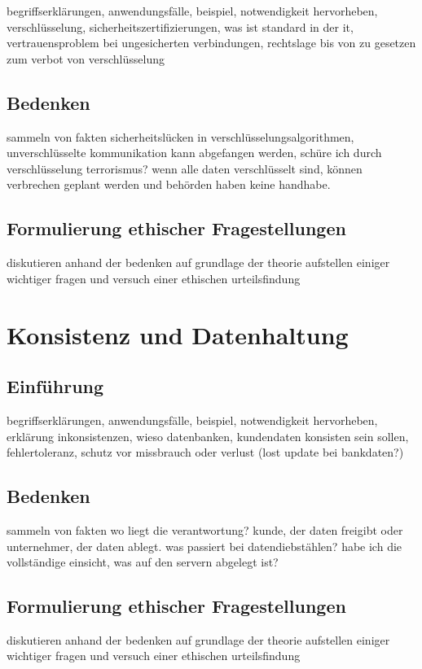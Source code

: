 \documentclass[letterpaper, 12pt]{article}
\let\tempsection\section
\renewcommand\section[1]{\vspace{-0.3cm}\tempsection{#1}\vspace{-0.3cm}}
\let\tempsubsection\subsection
\renewcommand\subsection[1]{\vspace{0cm}\tempsubsection{#1}\vspace{0cm}}
\begin{document}
begriffserklärungen, anwendungsfälle, beispiel, notwendigkeit hervorheben, verschlüsselung, sicherheitszertifizierungen, was ist standard in der it, vertrauensproblem bei ungesicherten verbindungen, rechtslage bis von zu gesetzen zum verbot von verschlüsselung

\subsection{Bedenken}

sammeln von fakten \newline
sicherheitslücken in verschlüsselungsalgorithmen, unverschlüsselte kommunikation kann abgefangen werden, schüre ich durch verschlüsselung terrorismus? wenn alle daten verschlüsselt sind, können verbrechen geplant werden und behörden haben keine handhabe.

\subsection{Formulierung ethischer Fragestellungen}

diskutieren anhand der bedenken auf grundlage der theorie \newline
aufstellen einiger wichtiger fragen und versuch einer ethischen urteilsfindung

\clearpage

\section{Konsistenz und Datenhaltung}

\subsection{Einführung}

begriffserklärungen, anwendungsfälle, beispiel, notwendigkeit hervorheben, erklärung inkonsistenzen, wieso datenbanken, kundendaten konsisten sein sollen, fehlertoleranz, schutz vor missbrauch oder verlust (lost update bei bankdaten?)

\subsection{Bedenken}

sammeln von fakten \newline
wo liegt die verantwortung? kunde, der daten freigibt oder unternehmer, der daten ablegt. was passiert bei datendiebstählen? habe ich die vollständige einsicht, was auf den servern abgelegt ist?

\subsection{Formulierung ethischer Fragestellungen}

diskutieren anhand der bedenken auf grundlage der theorie \newline
aufstellen einiger wichtiger fragen und versuch einer ethischen urteilsfindung

\clearpage



\lstlistoflistings
\listoffigures
\end{document}
